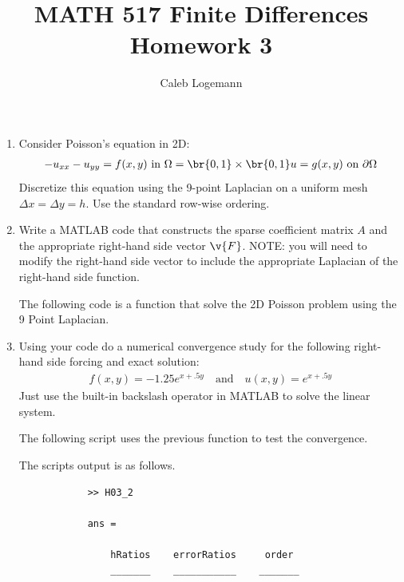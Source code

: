 \documentclass[11pt, oneside, titlepage]{article}
\title{MATH 517 Finite Differences Homework 3}
\author{Caleb Logemann}
\begin{document}
\maketitle

%
\begin{enumerate}
    \item %
        Consider Poisson's equation in 2D:
        \begin{align*}
            -u_{xx} - u_{yy} = f(x,y)\text{ in } \Omega = \br{0, 1} \times \br{0, 1}
            u = g(x,y)\text{ on } \partial\Omega
        \end{align*}
        Discretize this equation using the 9-point Laplacian on a uniform mesh
        $\Delta x = \Delta y = h$.
        Use the standard row-wise ordering.



    \item %
        Write a MATLAB code that constructs the sparse coefficient matrix $A$
        and the appropriate right-hand side vector $\v{F}$.
        NOTE: you will need to modify the right-hand side vector to include
        the appropriate Laplacian of the right-hand side function.

        The following code is a function that solve the 2D Poisson problem
        using the 9 Point Laplacian.
        

    \item %
        Using your code do a numerical convergence study for the following
        right-hand side forcing and exact solution:
        \begin{align*}
            f(x,y) = -1.25e^{x + .5y}\quad\text{and}\quad u(x,y) = e^{x + .5y}
        \end{align*}
        Just use the built-in backslash operator in MATLAB to solve the linear
        system.

        The following script uses the previous function to test the convergence.
        
        The scripts output is as follows.
        \begin{verbatim}
            >> H03_2

            ans = 

                hRatios    errorRatios     order 
                _______    ___________    _______


\end{verbatim}
\end{enumerate}
\end{document}
